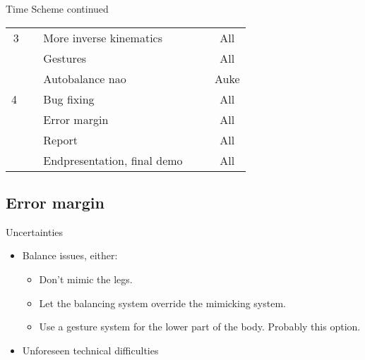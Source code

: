 \documentclass{beamer}
\begin{document}
\begin{frame}{Time Scheme continued}
\begin{tabular}{|c|l|c|}
\hline
3  & More inverse kinematics      & All\\
  & Gestures           & All\\
  & Autobalance nao         & Auke \\
\hline 
4   & Bug fixing           & All\\
  & Error margin         & All\\
  & Report           & All\\
\hline\hline
  & Endpresentation, final demo    & All \\
\hline
\end{tabular}
\end{frame}

\subsection{Error margin}
\begin{frame}{Uncertainties}
\begin{itemize}[<+->]
\item 
Balance issues, either:\begin{itemize}
\item Don't mimic the legs.
\item Let the balancing system override the mimicking system.
\item Use a gesture system for the lower part of the body. Probably this option.
\end{itemize}
\item Unforeseen technical difficulties
\end{itemize}
\end{frame}
\end{document}
